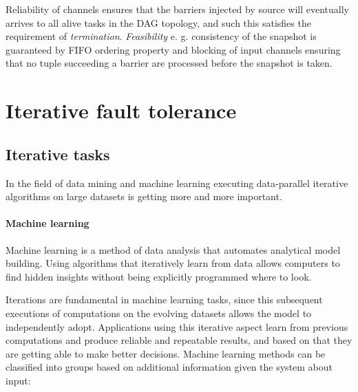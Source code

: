 Reliability of channels ensures that the barriers injected by source will eventually arrives to all alive tasks in the DAG topology, and such this  satisfies the requirement of \textit{termination}. \textit{Feasibility} e. g. consistency of the snapshot is guaranteed by FIFO ordering property and blocking of input channels ensuring that no tuple succeeding a barrier are processed before the snapshot is taken. 



\section{Iterative fault tolerance }
\subsection{Iterative tasks}
In the field of data mining and machine learning executing data-parallel iterative algorithms on large datasets is getting more and more important.
\paragraph{Machine learning}
\begin{displayquote}
Machine learning\cite{ml}%
is a method of data analysis that automates analytical model building. Using algorithms that iteratively learn from data allows computers to find hidden insights without being explicitly programmed where to look.
\end{displayquote}
Iterations are fundamental in machine learning tasks, since this subsequent executions of computations on the evolving datasets allows the model to independently adopt. Applications using this iterative aspect learn from previous computations and produce reliable and repeatable results, and based on that they are getting able to make better decisions.
Machine learning methods\cite{ml}%
 can be classified into groups based on additional information given the system about input:
 

